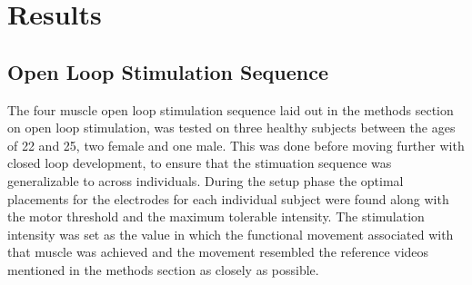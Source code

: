 




\section{Results}

\subsection{Open Loop Stimulation Sequence}
The four muscle open loop stimulation sequence laid out in the methods section on open loop stimulation, was tested on three healthy subjects between the ages of 22 and 25, two female and one male. This was done before moving further with closed loop development, to ensure that the stimuation sequence was generalizable to across individuals. During the setup phase the optimal placements for the electrodes for each individual subject were found along with the motor threshold and the maximum tolerable intensity. The stimulation intensity was set as the value in which the functional movement associated with that muscle was achieved and the movement resembled the reference videos mentioned in the methods section as closely as possible.

